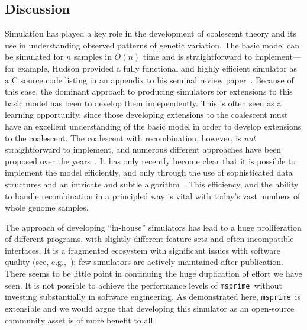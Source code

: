 \documentclass{article}
\newcommand{\msprime}[0]{\texttt{msprime}}
\newcommand{\msprime}[0]{{\texttt{msprime} }}
\begin{document}
\subsection*{Discussion}
Simulation has played a key role in the development of coalescent theory
and its use in understanding observed patterns of genetic variation.
The basic model can be simulated for $n$ samples in $O(n)$ time
and is straightforward to implement---for example, Hudson provided a fully
functional and highly efficient simulator as a C source code listing in an
appendix to his seminal review paper~\citep{hudson1990gene}. Because of
this ease, the dominant approach to producing simulators for extensions
to this basic model has been to develop them independently. This is
often seen as a learning opportunity, since those developing extensions
to the coalescent must have an excellent understanding of the basic
model in order to develop extensions to the coalescent.
The coalescent with recombination, however, is \emph{not} straightforward
to implement, and numerous different approaches have been
proposed over the
years~\citep{hudson1983properties,griffiths1997ancestral,wiuf1999recombination,
mcvean2005approximating}. It has only recently become clear that it is
possible to implement the model efficiently, and only through the use
of sophisticated data structures and an intricate and subtle
algorithm~\citep{kelleher2016efficient}.
This efficiency, and the ability to handle recombination in a principled
way is vital with today's vast numbers of whole genome samples.

The approach of developing ``in-house'' simulators
has lead to a huge proliferation of different programs, with
slightly different feature sets and often incompatible interfaces.
It is a fragmented ecosystem with significant issues with software
quality (see, e.g.,~\cite{yang2014critical});
few simulators are actively maintained after publication.
There seems to be little point
in continuing the huge duplication of effort we have seen.
It is not possible to achieve the performance levels of
\msprime\ without investing substantially in software engineering.
As demonstrated here, \msprime\ is extensible and we would argue
that developing this simulator as an open-source community asset
is of more benefit to all.
\end{document}
